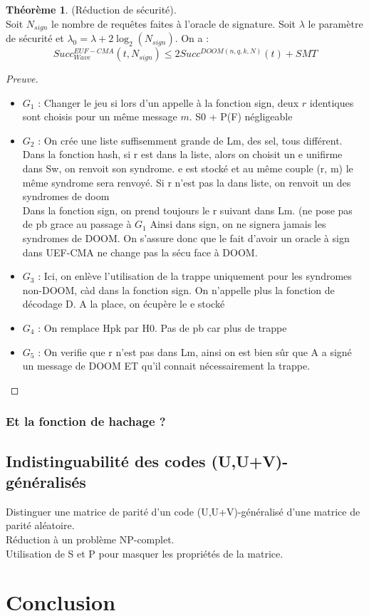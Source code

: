 \documentclass[12pt]{article}
\theoremstyle{definition}
\newtheorem{thm}{Théorème}[section]
\begin{document}
\begin{thm} (Réduction de sécurité). \\
Soit $N_{sign}$ le nombre de requêtes faites à l'oracle de signature. Soit $\lambda$ le paramètre de sécurité et $\lambda_0=\lambda + 2\log_2(N_{sign})$. On a :
$$Succ^{EUF-CMA}_{Wave}(t,N_{sign}) \leq 2Succ^{DOOM(n,q,k,N)}(t) + SMT$$
\end{thm}

\begin{proof}[Preuve]
\begin{itemize} On rappelle que correspond à notre jeu pour la sécurité EUF-CMA de Wave.
\item $G_1$ : Changer le jeu si lors d'un appelle à la fonction sign, deux $r$ identiques sont choisis pour un même message $m$. S0 + P(F) négligeable
\item $G_2$ : On crée une liste suffisemment grande de Lm, des sel, tous différent. Dans la fonction hash, si r est dans la liste, alors on choisit un e unifirme dans Sw, on renvoit son syndrome. e est stocké et au même couple (r, m) le même syndrome sera renvoyé. Si r n'est pas la dans liste, on renvoit un des syndromes de doom \\
Dans la fonction sign, on prend toujours le r suivant dans Lm. (ne pose pas de pb grace au passage à $G_1$ Ainsi dans sign, on ne signera jamais les syndromes de DOOM. On s'assure donc que le fait d'avoir un oracle à sign dans UEF-CMA ne change pas la sécu face à DOOM.
\item $G_3$ : Ici, on enlève l'utilisation de la trappe uniquement pour les syndromes non-DOOM, càd dans la fonction sign. On n'appelle plus la fonction de décodage D. A la place, on écupère le e stocké
\item $G_4$ : On remplace Hpk par H0. Pas de pb car plus de trappe
\item $G_5$ : On verifie que r n'est pas dans Lm, ainsi on est bien sûr que A a signé un message de DOOM ET qu'il connait nécessairement la trappe. 
\end{itemize}
\end{proof}

\subsubsection{Et la fonction de hachage ?}

\subsection{Indistinguabilité des codes (U,U+V)-généralisés}
Distinguer une matrice de parité d'un code (U,U+V)-généralisé d'une matrice de parité aléatoire. \\
Réduction à un problème NP-complet. \\
Utilisation de S et P pour masquer les propriétés de la matrice. \\

\section*{Conclusion}

\newpage




\end{document}
